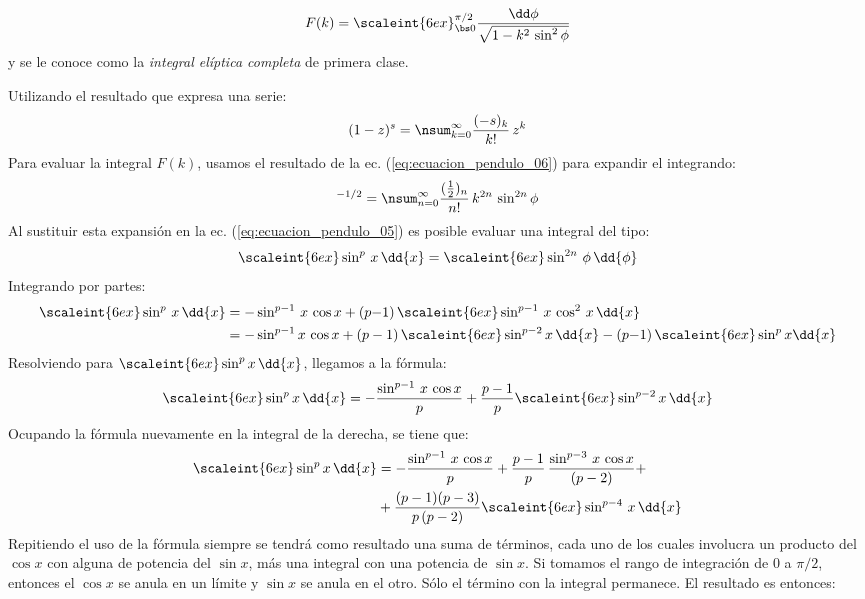 \begin{equation}
F(k) = \scaleint{6ex}_{\bs 0}^{\pi/2} \dfrac{\dd \phi}{\sqrt{1 - k^{2} \, \sin^{2} \phi} }
\label{eq:ecuacion_pendulo_05}
\end{equation}
y se le conoce como la \emph{integral elíptica completa} de primera clase.
\par
Utilizando el resultado que expresa una serie:
\begin{equation}
(1 - z)^{s} = \nsum_{k=0}^{\infty} \dfrac{(-s)_{k}}{k!} \, z^{k}
\label{eq:ecuacion_pendulo_06}
\end{equation}
Para evaluar la integral $F(k)$, usamos el resultado de la ec. (\ref{eq:ecuacion_pendulo_06}) para expandir el integrando:
\begin{align*}
[ 1 - k^{2} \, \sin^{2} \phi ]^{-1/2} = \nsum_{n=0}^{\infty} \dfrac{(\frac{1}{2})_{n}}{n!} \, k^{2 n} \, \sin^{2 n} \phi
\end{align*}
Al sustituir esta expansión en la ec. (\ref{eq:ecuacion_pendulo_05}) es posible evaluar una integral del tipo:
\begin{align*}
\scaleint{6ex} \sin^{p} \, x \, \dd{x} = \scaleint{6ex} \sin^{2 n} \, \phi \, \dd{\phi}
\end{align*}
Integrando por partes:
\begin{align*}
\scaleint{6ex} \sin^{p} \, x \, \dd{x} &= - \sin^{p-1} \, x \, \cos x + (p {-} 1) \, \scaleint{6ex} \sin^{p-1} \, x \, \cos^{2} \, x \, \dd{x} \\
&= -\sin^{p-1} x \, \cos x + (p -{} 1) \, \scaleint{6ex} \sin^{p-2} x \, \dd{x} - (p {-} 1) \, \scaleint{6ex} \sin^{p} x \dd{x} 
\end{align*}
Resolviendo para $\displaystyle{\scaleint{6ex} \sin^{p} x \, \dd{x}}$, llegamos a la fórmula:
\begin{align*}
\scaleint{6ex} \sin^{p} x \, \dd{x} = - \dfrac{\sin^{p-1} \, x \, \cos x}{p} + \dfrac{p - 1}{p} \scaleint{6ex} \sin^{p-2} x \, \dd{x}
\end{align*}
Ocupando la fórmula nuevamente en la integral de la derecha, se tiene que:
\begin{align*}
\scaleint{6ex} \sin^{p} x \, \dd{x} &= - \dfrac{\sin^{p-1} \, x \, \cos x}{p} + \dfrac{p - 1}{p} \, \dfrac{\sin^{p-3} \, x \, \cos x}{(p - 2)} + \\
&+ \dfrac{(p - 1)(p - 3)}{p \, (p - 2)} \scaleint{6ex} \sin^{p-4} \, x \, \dd{x}
\end{align*}
Repitiendo el uso de la fórmula siempre se tendrá como resultado una suma de términos, cada uno de los cuales involucra un producto del $\cos x$ con alguna de potencia del $\sin x$, más una integral con una potencia de $\sin x$. Si tomamos el rango de integración de $0$ a $\pi / 2$, entonces el $\cos x$ se anula en un límite y $\sin x$ se anula en el otro. Sólo el término con la integral permanece. El resultado es entonces:
